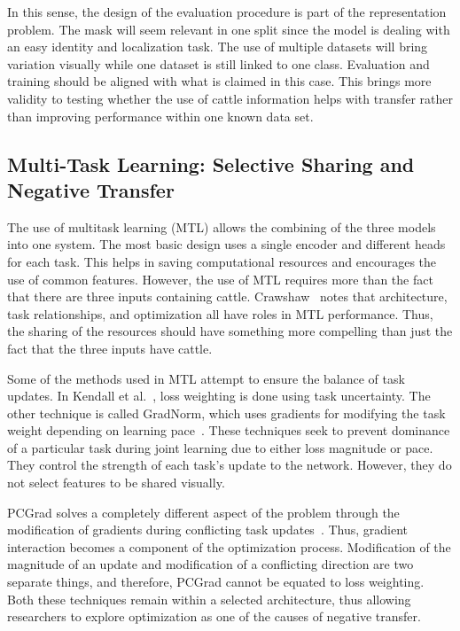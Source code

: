 In this sense, the design of the evaluation procedure is part of the representation problem. The mask will seem relevant in one split since the model is dealing with an easy identity and localization task. The use of multiple datasets will bring variation visually while one dataset is still linked to one class. Evaluation and training should be aligned with what is claimed in this case. This brings more validity to testing whether the use of cattle information helps with transfer rather than improving performance within one known data set.

\subsection{Multi-Task Learning: Selective Sharing and Negative Transfer}

The use of multitask learning (MTL) allows the combining of the three models into one system. The most basic design uses a single encoder and different heads for each task. This helps in saving computational resources and encourages the use of common features. However, the use of MTL requires more than the fact that there are three inputs containing cattle. Crawshaw~\cite{crawshaw2020mtl} notes that architecture, task relationships, and optimization all have roles in MTL performance. Thus, the sharing of the resources should have something more compelling than just the fact that the three inputs have cattle.

Some of the methods used in MTL attempt to ensure the balance of task updates. In Kendall et al.~\cite{kendall2018multi}, loss weighting is done using task uncertainty. The other technique is called GradNorm, which uses gradients for modifying the task weight depending on learning pace~\cite{chen2018gradnorm}. These techniques seek to prevent dominance of a particular task during joint learning due to either loss magnitude or pace. They control the strength of each task's update to the network. However, they do not select features to be shared visually.

PCGrad solves a completely different aspect of the problem through the modification of gradients during conflicting task updates~\cite{yu2020pcgrad}. Thus, gradient interaction becomes a component of the optimization process. Modification of the magnitude of an update and modification of a conflicting direction are two separate things, and therefore, PCGrad cannot be equated to loss weighting. Both these techniques remain within a selected architecture, thus allowing researchers to explore optimization as one of the causes of negative transfer.

